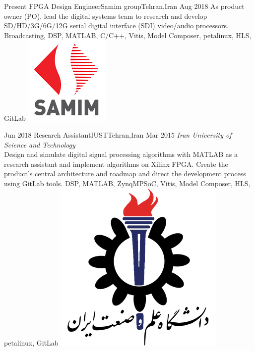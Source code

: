 
\begin{experiences}

  \experience
  {Present} {FPGA Design Engineer}{Samim group}{Tehran,Iran}
  {Aug 2018} {
    As product owner (PO), lead the digital systems team to research and develop
    SD/HD/3G/6G/12G serial digital interface (SDI) video/audio processors.
  }
  {Broadcasting, DSP, MATLAB, C/C++, Vitis, Model Composer, petalinux, HLS, GitLab}
  {\includegraphics[scale=0.2]{graphics/samim_logo}}

  \emptySeparator

  \experience
  {Jun 2018} {Research Assistant}{IUST}{Tehran,Iran}
  {Mar 2015} {
    \emph{Iran University of Science and Technology}\\
    Design and simulate digital signal processing algorithms with MATLAB as a research 
    assistant and implement algorithms on Xilinx FPGA. Create the product's central 
    architecture and roadmap and direct the development process using GitLab tools. 
  }
  {DSP, MATLAB, ZynqMPSoC, Vitis, Model Composer, HLS, petalinux, GitLab}
  {\includegraphics[scale=0.12]{graphics/IUST_logo_color}}

  \emptySeparator


\end{experiences}
